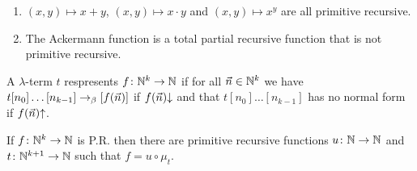 \begin{example}
    \hfill
    \begin{enumerate}
        \item $(x, y) \mapsto x + y$, $(x, y) \mapsto x \cdot y$ and $(x, y) \mapsto x^y$ are all primitive recursive.
        \item The \alert{Ackermann function} is a total partial recursive function that is not primitive recursive.
    \end{enumerate}
\end{example}

\begin{boxdefi}
    A $\lambda$-term $t$ \alert{respresents} $f \colon \mathbb{N}^k \to \mathbb{N}$ if for all $\vec{n} \in \mathbb{N}^k$ we have $t[n_0] \dots [n_{k-1}] \to_{\beta} [f(\vec{n})]$ if $f(\vec{n}){\downarrow}$ and that $t[n_0] \dots [n_{k-1}]$ has no normal form if $f(\vec{n}){\uparrow}$.
\end{boxdefi}

\begin{boxprop}
    If $f \colon \mathbb{N}^k \to \mathbb{N}$ is P.R. then there are primitive recursive functions $u \colon \mathbb{N} \to \mathbb{N}$ and $t \colon \mathbb{N}^{k+ 1} \to \mathbb{N}$ such that $f = u \circ \mu_t$.
\end{boxprop}


